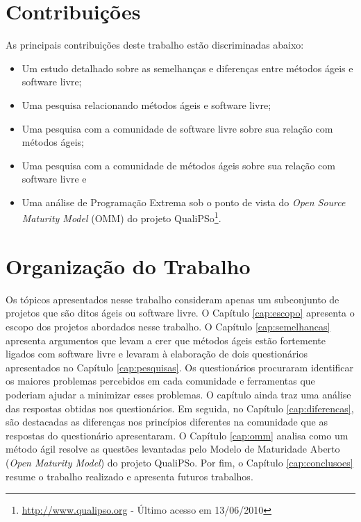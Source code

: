 \section{Contribuições}
\label{sec:contribucoes}

As principais contribuições deste trabalho estão discriminadas abaixo:

\begin{itemize}
\item Um estudo detalhado sobre as semelhanças e diferenças entre
  métodos ágeis e software livre;
\item Uma pesquisa relacionando métodos ágeis e software livre;
\item Uma pesquisa com a comunidade de software livre sobre sua
  relação com métodos ágeis;
\item Uma pesquisa com a comunidade de métodos ágeis sobre sua relação
  com software livre e
\item Uma análise de Programação Extrema \cite{XP01} sob o ponto de
  vista do \emph{Open Source Maturity Model} (OMM) do projeto
  QualiPSo\footnote{\url{http://www.qualipso.org} - Último acesso em 13/06/2010}.
\end{itemize}

\section{Organização do Trabalho}
\label{sec:organizacao_trabalho}

Os tópicos apresentados nesse trabalho consideram apenas um
subconjunto de projetos que são ditos ágeis ou software livre. O
Capítulo \ref{cap:escopo} apresenta o escopo dos projetos abordados
nesse trabalho. O Capítulo \ref{cap:semelhancas} apresenta argumentos
que levam a crer que métodos ágeis estão fortemente ligados com
software livre e levaram à elaboração de dois questionários
apresentados no Capítulo \ref{cap:pesquisas}. Os questionários
procuraram identificar os maiores problemas percebidos em cada
comunidade e ferramentas que poderiam ajudar a minimizar esses
problemas. O capítulo ainda traz uma análise das respostas obtidas nos
questionários.  Em seguida, no Capítulo \ref{cap:diferencas}, são
destacadas as diferenças nos princípios diferentes na comunidade que
as respostas do questionário apresentaram. O Capítulo \ref{cap:omm}
analisa como um método ágil resolve as questões levantadas pelo Modelo
de Maturidade Aberto ({\it Open Maturity Model}) do projeto QualiPSo.
Por fim, o Capítulo \ref{cap:conclusoes} resume o trabalho realizado e
apresenta futuros trabalhos.
